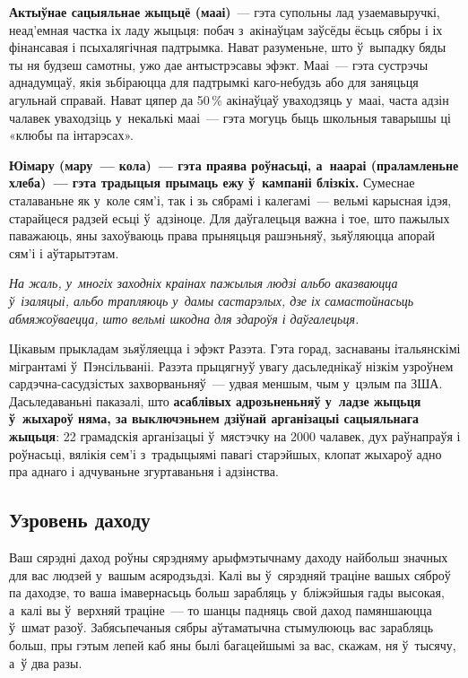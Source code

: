 \textbf{Актыўнае сацыяльнае жыцьцё (мааі)}~--- гэта супольны лад узаемавыручкі, неад'емная частка іх ладу жыцьця: побач з~акінаўцам заўсёды ёсьць сябры і іх фінансавая і псыхалягічная падтрымка. Нават разуменьне, што ў~выпадку бяды ты ня будзеш самотны, ужо дае антыстрэсавы эфэкт. Мааі~--- гэта сустрэчы аднадумцаў, якія зьбіраюцца для падтрымкі каго-небудзь або для заняцьця агульнай справай. Нават цяпер да 50\,\% акінаўцаў уваходзяць у~мааі, часта адзін чалавек уваходзіць у~некалькі мааі~--- гэта могуць быць школьныя таварышы ці «клюбы па інтарэсах».

\textbf{Юімару (мару~--- кола)~--- гэта праява роўнасьці, а~наараі (праламленьне хлеба)~--- гэта традыцыя прымаць ежу ў~кампаніі блізкіх.} Сумеснае сталаваньне як у~коле сям'і, так і зь сябрамі і калегамі~--- вельмі карысная ідэя, старайцеся радзей есьці ў~адзіноце. Для даўгалецьця важна і тое, што пажылых паважаюць, яны захоўваюць права прыняцьця рашэньняў, зьяўляюцца апорай сям'і і аўтарытэтам.

\emph{На жаль, у~многіх заходніх краінах пажылыя людзі альбо аказваюцца ў~ізаляцыі, альбо трапляюць у~дамы састарэлых, дзе іх самастойнасьць абмяжоўваецца, што вельмі шкодна для здароўя і даўгалецьця.}

Цікавым прыкладам зьяўляецца і эфэкт Разэта. Гэта горад, заснаваны італьянскімі мігрантамі ў~Пэнсільваніі. Разэта прыцягнуў увагу дасьледнікаў нізкім узроўнем сардэчна-сасудзістых захворваньняў~--- удвая меншым, чым у~цэлым па ЗША. Дасьледаваньні паказалі, што \textbf{асаблівых адрозьненьняў у~ладзе жыцьця ў~жыхароў няма, за выключэньнем дзіўнай арганізацыі сацыяльнага жыцьця}: 22 грамадскія арганізацыі ў~мястэчку на 2000 чалавек, дух раўнапраўя і роўнасьці, вялікія сем'і з~традыцыямі павагі старэйшых, клопат жыхароў адно пра аднаго і адчуваньне згуртаваньня і адзінства.

\subsection*{Узровень даходу}

Ваш сярэдні даход роўны сярэдняму арыфмэтычнаму даходу найбольш значных для вас людзей у~вашым асяродзьдзі. Калі вы ў~сярэдняй траціне вашых сяброў па даходзе, то ваша імавернасьць больш зарабляць у~бліжэйшыя гады высокая, а~калі вы ў~верхняй траціне~--- то шанцы падняць свой даход памяншаюцца ў~шмат разоў. Забясьпечаныя сябры аўтаматычна стымулююць вас зарабляць больш, пры гэтым лепей каб яны былі багацейшымі за вас, скажам, ня ў~тысячу, а~ў два разы.

